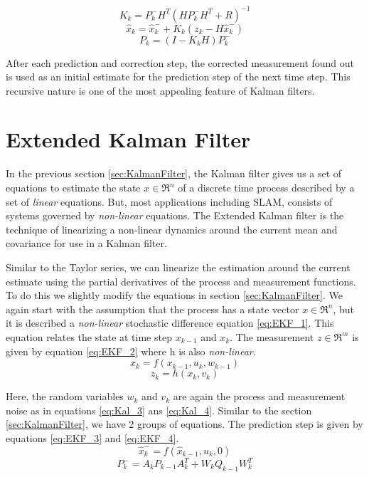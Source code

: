 \begin{equation}
\label{eq:Kal_7}
K_k = P^-_kH^T(HP^-_kH^T+R)^{-1}
\end{equation}
\begin{equation}
\label{eq:Kal_8}
\hat{x}_k = \hat{x}^-_k+K_k(z_k-H\hat{x}^-_k)
\end{equation}
\begin{equation}
\label{eq:Kal_9}
P_k = (I-K_kH)P^-_k
\end{equation} 

After each prediction and correction step, the corrected measurement found out is used as an initial estimate for the prediction step of the next time step. This recursive nature is one of the most appealing feature of Kalman filters. 

\section{Extended Kalman Filter}
\label{sec:EKF}
 In the previous section \ref{sec:KalmanFilter}, the Kalman filter gives us a set of equations to estimate the state $ x \in \Re^n $ of a discrete time process described by a set of \textit{linear} equations. But, most applications including SLAM, consists of systems governed by \textit{non-linear} equations. The Extended Kalman filter is the technique of linearizing a non-linear dynamics around the current mean and covariance for use in a Kalman filter.
 
 Similar to the Taylor series, we can linearize the estimation around the current estimate using the partial derivatives of the process and measurement functions. To do this we slightly modify the equations in section \ref{sec:KalmanFilter}. We again start with the assumption that the process has a state vector $ x \in \Re^n $, but it is described a \textit{non-linear} stochastic difference equation \ref{eq:EKF_1}. This equation relates the state at time step $ x_{k-1}$  and  $x_k $. The measurement $ z \in \Re^m $ is given by equation \ref{eq:EKF_2} where h is also \textit{non-linear}.
 \begin{equation}
 \label{eq:EKF_1}
 x_k = f(x_{k-1},u_k,w_{k-1})
 \end{equation}
 \begin{equation}
 \label{eq:EKF_2}
 z_k = h(x_k,v_k)
 \end{equation}

Here, the random variables $ w_k$  and  $v_k $ are again the process and measurement noise as in equations \ref{eq:Kal_3} ans \ref{eq:Kal_4}. Similar to the section \ref{sec:KalmanFilter}, we have 2 groups of equations. The prediction step is given by equations \ref{eq:EKF_3} and \ref{eq:EKF_4}.
\begin{equation}
 \label{eq:EKF_3}
 \hat{x}^-_k = f(\hat{x}_{k-1},u_k,0)
\end{equation}
\begin{equation}
 \label{eq:EKF_4}
 P^-_k = A_kP_{k-1}A_k^T + W_kQ_{k-1}W^T_k
\end{equation}

